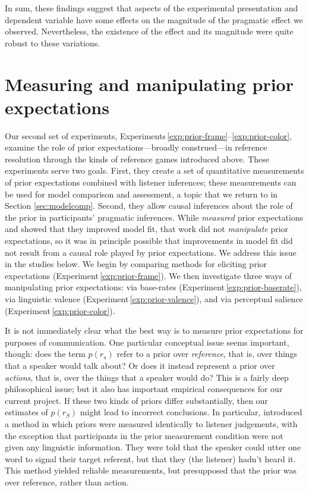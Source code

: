 \documentclass[man,noapacite]{apa2}
\newcounter{Experiment}
\newcommand{\exptref}[1]{Experiment\,\ref{#1}}
\newcommand{\exptrefrange}[2]{Experiments\,\ref{#1}--\ref{#2}}
\begin{document}
In sum, these findings suggest that aspects of the experimental presentation and dependent variable have some effects on the magnitude of the pragmatic effect we observed. Nevertheless, the existence of the effect and its magnitude were quite robust to these variations.

\section{Measuring and manipulating prior expectations}
\label{sec:prior}

Our second set of experiments, \exptrefrange{exp:prior-frame}{exp:prior-color}, examine the role of prior expectations---broadly construed---in reference resolution through the kinds of reference games introduced above. These experiments serve two goals. First, they create a set of quantitative measurements of prior expectations combined with listener inferences; these measurements can be used for model comparison and assessment, a topic that we return to in Section \ref{sec:modelcomp}. Second, they allow causal inferences about the role of the prior in participants' pragmatic inferences. While  \emph{measured} prior expectations and showed that they improved model fit, that work did not \emph{manipulate} prior expectations, so it was in principle possible that improvements in model fit did not result from a causal role played by prior expectations. We address this issue in the studies below. We begin by comparing methods for eliciting prior expectations (\exptref{exp:prior-frame}). We then investigate three ways of manipulating prior expectations: via base-rates (\exptref{exp:prior-baserate}), via linguistic valence (\exptref{exp:prior-valence}), and via perceptual salience (\exptref{exp:prior-color}).

It is not immediately clear what the best way is to measure prior expectations for purposes of communication. One particular conceptual issue seems important, though: does the term $p(r_s)$ refer to a prior over \emph{reference}, that is, over things that a speaker would talk about? Or does it instead represent a prior over \emph{actions}, that is, over the things that a speaker would do? This is a fairly deep philosophical issue; but it also has important empirical consequences for our current project. If these two kinds of priors differ substantially, then our estimates of $p(r_S)$ might lead to incorrect conclusions. In particular,  introduced a method in which priors were measured identically to listener judgements, with the exception that participants in the prior measurement condition were not given any linguistic information. They were told that the speaker could utter one word to signal their target referent, but that they (the listener) hadn't heard it. This method yielded reliable measurements, but presupposed that the prior was over reference, rather than action.
\end{document}
